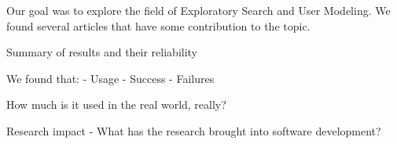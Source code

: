 \documentclass{sigchi}
\begin{document}
Our goal was to explore the field of Exploratory Search and User Modeling. We found several articles that have some contribution to the topic.

Summary of results and their reliability 

We found that:
- Usage
- Success
- Failures

How much is it used in the real world, really?

Research impact
- What has the research brought into software development?

\nocite{*} %

%
%
%
%
%
\balance



\end{document}
